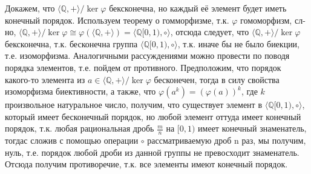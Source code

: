 \documentclass[a4paper,14pt]{article} %
\begin{document}
 Докажем, что $\langle \mathds{Q}, + \rangle / \ker \varphi$ бексконечна, но каждый её элемент будет иметь конечный порядок. 
 Используем теорему о гомморфизме, т.к. $\varphi$ гомоморфизм, сл-но, $\langle \mathds{Q}, + \rangle / \ker \varphi \cong \varphi(\langle \mathds{Q}, + \rangle) = \langle \mathds{Q}[0, 1), \circ \rangle$, отсюда следует, что $\langle \mathds{Q}, + \rangle / \ker \varphi$ бексконечна, т.к. бесконечна группа $\langle \mathds{Q}[0, 1), \circ \rangle$, т.к. иначе бы не было биекции, т.е. изоморфизма.
 Аналогичными рассуждениями можно провести по поводя порядка элементов, т.е. пойдем от противного. Предположим, что порядок какого-то элемента из $a \in \langle \mathds{Q}, + \rangle / \ker \varphi$ бесконечен, тогда в силу свойства изоморфизма биективности, а также, что $\varphi (a^k) = (\varphi(a))^k$, где $k$ произвольное натуральное число, получим, что существует элемент в $\langle \mathds{Q}[0, 1), \circ \rangle$, который имеет бесконечный порядок, но любой элемент оттуда имеет конечный порядок,
 т.к. любая рациональная дробь $\frac{m}{n}$ на $[0, 1)$ имеет конечный знаменатель, тогдас сложив с помощью операции $\circ$ рассматриваемую дроб n раз, мы получим, нуль, т.е. порядок любой дроби из данной группы не превосходит знаменатель. 
 Отсюда получим противоречие, т.к. все элементы имеют конечный порядок.
\end{document}

